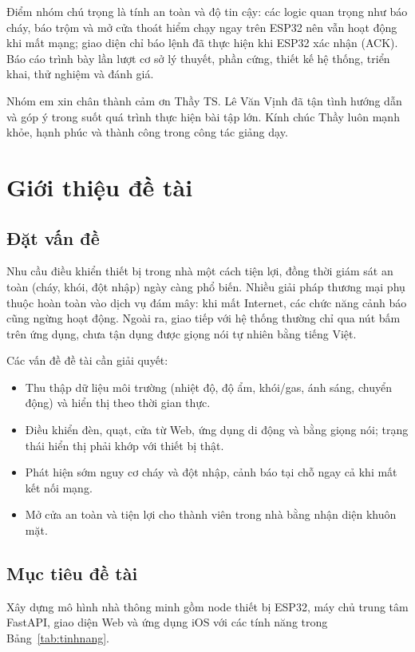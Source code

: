 \documentclass[12pt,a4paper]{extarticle}
\newcommand{\GiangVien}{TS. Lê Văn Vịnh}
\begin{document}
Điểm nhóm chú trọng là tính an toàn và độ tin cậy: các logic quan trọng như báo cháy, báo trộm và mở cửa thoát hiểm chạy ngay trên ESP32 nên vẫn hoạt động khi mất mạng; giao diện chỉ báo lệnh đã thực hiện khi ESP32 xác nhận (ACK). Báo cáo trình bày lần lượt cơ sở lý thuyết, phần cứng, thiết kế hệ thống, triển khai, thử nghiệm và đánh giá.

Nhóm em xin chân thành cảm ơn Thầy \GiangVien{} đã tận tình hướng dẫn và góp ý trong suốt quá trình thực hiện bài tập lớn. Kính chúc Thầy luôn mạnh khỏe, hạnh phúc và thành công trong công tác giảng dạy.
\clearpage

\section{Giới thiệu đề tài}
\subsection{Đặt vấn đề}
Nhu cầu điều khiển thiết bị trong nhà một cách tiện lợi, đồng thời giám sát an toàn (cháy, khói, đột nhập) ngày càng phổ biến. Nhiều giải pháp thương mại phụ thuộc hoàn toàn vào dịch vụ đám mây: khi mất Internet, các chức năng cảnh báo cũng ngừng hoạt động. Ngoài ra, giao tiếp với hệ thống thường chỉ qua nút bấm trên ứng dụng, chưa tận dụng được giọng nói tự nhiên bằng tiếng Việt.

Các vấn đề đề tài cần giải quyết:
\begin{itemize}
  \item Thu thập dữ liệu môi trường (nhiệt độ, độ ẩm, khói/gas, ánh sáng, chuyển động) và hiển thị theo thời gian thực.
  \item Điều khiển đèn, quạt, cửa từ Web, ứng dụng di động và bằng giọng nói; trạng thái hiển thị phải khớp với thiết bị thật.
  \item Phát hiện sớm nguy cơ cháy và đột nhập, cảnh báo tại chỗ ngay cả khi mất kết nối mạng.
  \item Mở cửa an toàn và tiện lợi cho thành viên trong nhà bằng nhận diện khuôn mặt.
\end{itemize}

\subsection{Mục tiêu đề tài}
Xây dựng mô hình nhà thông minh gồm node thiết bị ESP32, máy chủ trung tâm FastAPI, giao diện Web và ứng dụng iOS với các tính năng trong Bảng~\ref{tab:tinhnang}.
\end{document}
